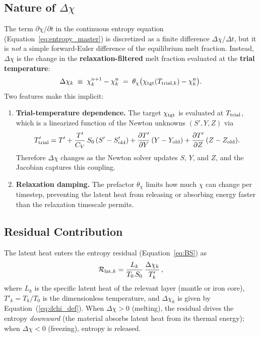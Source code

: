 \documentclass{aastex631}
\newcommand{\pp}{\partial}
\newcommand{\Cv}{C_V}
\begin{document}
\subsection{Nature of $\Delta\chi$}\label{sec:dchi_nature}

The term $\pp\chi/\pp t$ in the continuous entropy equation
(Equation~\ref{eq:entropy_master}) is discretized as a finite
difference $\Delta\chi / \Delta t$, but it is \emph{not} a simple
forward-Euler difference of the equilibrium melt fraction.  Instead,
$\Delta\chi$ is the change in the \textbf{relaxation-filtered} melt
fraction evaluated at the \textbf{trial temperature}:
\begin{equation}\label{eq:dchi_def}
  \Delta\chi_k
  \;\equiv\; \chi_k^{n+1} - \chi_k^n
  \;=\; \theta_\chi \bigl(\chi_{\rm tgt}(T_{{\rm trial},k}) - \chi_k^n\bigr).
\end{equation}
Two features make this implicit:
\begin{enumerate}
  \item \textbf{Trial-temperature dependence.}  The target
    $\chi_{\rm tgt}$ is evaluated at $T_{\rm trial}$, which is a
    linearized function of the Newton unknowns $(S', Y, Z)$ via
    \begin{equation}
      T'_{\rm trial} = T' + \frac{T'}{\Cv}\,S_0\,(S' - S'_{\rm old})
        + \frac{\pp T'}{\pp Y}\,(Y - Y_{\rm old})
        + \frac{\pp T'}{\pp Z}\,(Z - Z_{\rm old}).
    \end{equation}
    Therefore $\Delta\chi$ changes as the Newton solver updates $S$,
    $Y$, and $Z$, and the Jacobian captures this coupling.
  \item \textbf{Relaxation damping.}  The prefactor $\theta_\chi$
    limits how much $\chi$ can change per timestep, preventing the
    latent heat from releasing or absorbing energy faster than the
    relaxation timescale permits.
\end{enumerate}

\subsection{Residual Contribution}\label{sec:lat_residual}

The latent heat enters the entropy residual
(Equation~\ref{eq:BS}) as
\begin{equation}\label{eq:Rlat}
  \mathcal{R}_{{\rm lat},k}
  = \frac{L_k}{T_0\,S_0}\,\frac{\Delta\chi_k}{T'_k}\,,
\end{equation}
where $L_k$ is the specific latent heat of the relevant layer
(mantle or iron core), $T'_k = T_k/T_0$ is the dimensionless
temperature, and $\Delta\chi_k$ is given by
Equation~(\ref{eq:dchi_def}).  When $\Delta\chi > 0$ (melting), the
residual drives the entropy \emph{downward} (the material absorbs
latent heat from its thermal energy); when $\Delta\chi < 0$
(freezing), entropy is released.
\end{document}

